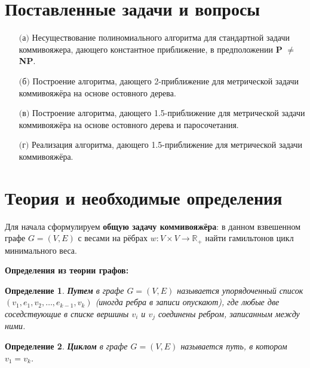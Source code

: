 \documentclass[14pt]{article}
\newtheorem{Def}{Определение}
\begin{document}
		
	\section{Поставленные задачи и вопросы}
	
		\begin{enumerate}
			\item[$($а$)$] Несуществование полиномиального алгоритма для стандартной задачи коммивояжера, дающего константное приближение, в предположении \textbf{P} $\ne$ \textbf{NP}.
			\item[$($б$)$] Построение алгоритма, дающего 2-приближение для метрической задачи коммивояжёра на основе остовного дерева.
			\item[$($в$)$] Построение алгоритма, дающего 1.5-приближение для метрической задачи коммивояжёра на основе остовного дерева и паросочетания. 
			\item[$($г$)$] Реализация алгоритма, дающего 1.5-приближение для метрической задачи коммивояжёра.
		\end{enumerate}
		
		
	\section{Теория и необходимые определения}
		
		Для начала сформулируем \textbf{общую задачу коммивояжёра}: в данном взвешенном графе $G = (V, E)$ с весами на рёбрах $w: V \times V \rightarrow \mathbb{R}_+$ найти гамильтонов цикл минимального веса.
		
		\begin{center}
			\textbf{\large Определения из теории графов:}
		\end{center}
		
		\begin{Def}
			\textbf{Путем} в графе $G = (V, E)$ называется упорядоченный список $(v_1, e_1, v_2, \dots, e_{k-1}, v_k)$ (иногда ребра в записи опускают), где любые две соседствующие в списке вершины $v_i$ и $v_j$ соединены ребром, записанным между ними.
		\end{Def}

		\begin{Def}
			\textbf{Циклом} в графе $G = (V, E)$ называется путь, в котором $v_1 = v_k$.
		\end{Def}
		
\end{document}

